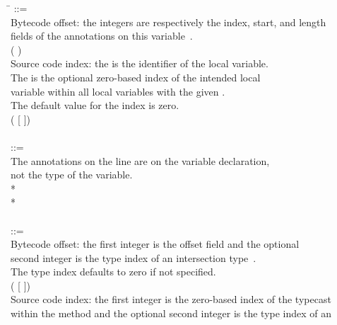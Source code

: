 \documentclass{article}
\begin{document}
\begin{tabbing}
\qquad \= \kill
{} ::= \\
\qquad    \bnfcmt Bytecode offset: the integers are respectively the index, start, and length \\
\qquad    \bnfcmt fields of the annotations on this variable~\cite{JSR308-webpage-201110}. \\
\qquad    ( \bnflit{\#}  \bnflit{+} ) \\
\qquad    \bnfcmt Source code index: the  is the identifier of the local variable. \\
\qquad    \bnfcmt The  is the optional zero-based index of the intended local \\
\qquad    \bnfcmt variable within all local variables with the given . \\
\qquad    \bnfcmt The default value for the index is zero. \\
\qquad    \bnfor{} ( [\bnflit{*} ]) \\
\\
 ::= \\
\qquad    \bnfcmt The annotations on the  line are on the variable declaration, \\
\qquad    \bnfcmt not the type of the variable. \\
\qquad    {}  \bnflit{:} * \lineend \\
\qquad    {}* \\
\\
 ::= \\
\qquad    \bnfcmt Bytecode offset: the first integer is the offset field and the optional \\
\qquad    \bnfcmt second integer is the type index of an intersection type~\cite{JSR308-webpage-201110}. \\
\qquad    \bnfcmt The type index defaults to zero if not specified. \\
\qquad    (\bnflit{\#}  [ \bnflit{,}  ]) \\
\qquad    \bnfcmt Source code index: the first integer is the zero-based index of the typecast \\
\qquad    \bnfcmt within the method and the optional second integer is the type index of an \\

\end{tabbing}
\end{document}
